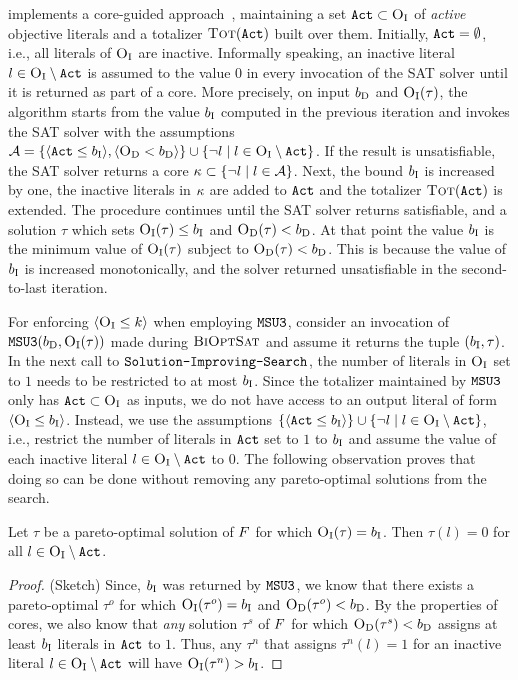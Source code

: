 \msu{} implements a core-guided approach~\autocite{DBLP:journals/corr/abs-0712-1097,DBLP:conf/sat/AnsoteguiBL09}, maintaining a set $\texttt{Act} \subset \textsc{O}_{\text{I}}$ of \emph{active} objective literals and a totalizer $\textsc{Tot}(\texttt{Act})$ built over them. 
Initially, $\texttt{Act} = \emptyset$, i.e., all literals of $\textsc{O}_{\text{I}}$ are inactive.
Informally speaking, an inactive literal $l \in \textsc{O}_{\text{I}} \setminus \texttt{Act}$ is assumed to the value $0$ in every invocation of the SAT solver until it is returned as part of a core.
More precisely, on input $b_{\text{D}}$ and $\textsc{O}_{\text{I}}(\tau)$, the algorithm starts from the value $b_{\text{I}}$ computed in the previous iteration and invokes the SAT solver with the assumptions $\mathcal{A} = \{\langle \texttt{Act} \leq b_{\text{I}} \rangle, \langle \textsc{O}_{\text{D}} < b_{\text{D}} \rangle  \} \cup \{ \lnot l \mid l \in \textsc{O}_{\text{I}} \setminus \texttt{Act}\}$.
If the result is unsatisfiable, the SAT solver returns a core $\kappa \subset \{\lnot l \mid l \in \mathcal{A}\}$.
Next, the bound $b_{\text{I}}$ is increased by one, the inactive literals in $\kappa$ are added to $\texttt{Act}$ and the totalizer $\textsc{Tot}(\texttt{Act})$ is extended.
The procedure continues until the SAT solver returns satisfiable, and a solution $\tau$ which sets $\textsc{O}_{\text{I}}(\tau) \leq b_{\text{I}}$ and $\textsc{O}_{\text{D}}(\tau) < b_{\text{D}}$.
At that point the value $b_{\text{I}}$ is the minimum value of $\textsc{O}_{\text{I}}(\tau)$ subject to $\textsc{O}_{\text{D}}(\tau) < b_{\text{D}}$.
This is because the value of $b_{\text{I}}$ is increased monotonically, and the solver returned unsatisfiable in the second-to-last iteration. 

For enforcing $\langle \textsc{O}_{\text{I}} \leq k \rangle$ when employing $\texttt{MSU3}$, consider an invocation of $\texttt{MSU3}(b_{\text{D}} , \textsc{O}_{\text{I}}(\tau))$ made during $\textsc{BiOptSat}$ and assume it returns the tuple $(b_{\text{I}}, \tau)$. 
In the next call to $\texttt{Solution-\allowbreak{}Improving-\allowbreak{}Search}$, the number of literals in $\textsc{O}_{\text{I}}$ set to $1$ needs to be restricted to at most $b_{\text{I}}$. 
Since the totalizer maintained by $\texttt{MSU3}$ only has $\texttt{Act} \subset \textsc{O}_{\text{I}}$ as inputs, we do not have access to an output literal of form  $\langle \textsc{O}_{\text{I}} \leq b_{\text{I}} \rangle$.
Instead, we use  the assumptions $\{\langle \texttt{Act} \leq b_{\text{I}} \rangle\} \cup \{ \lnot l \mid l \in \textsc{O}_{\text{I}} \setminus \texttt{Act} \}$, i.e., restrict the number of literals in $\texttt{Act}$ set to $1$ to $b_{\text{I}}$ and assume the value of each inactive literal $l \in \textsc{O}_{\text{I}} \setminus \texttt{Act}$ to $0$. 
The following observation proves that doing so can be done without removing any pareto-optimal solutions from the search. 
\begin{observation}\label{obs:sound}
  Let $\tau$ be a pareto-optimal solution of $F$ for which $\textsc{O}_{\text{I}}(\tau) = b_{\text{I}}$.
  Then $\tau(l) = 0$ for all $l \in \textsc{O}_{\text{I}} \setminus \texttt{Act}$. 
\end{observation}
\begin{proof}(Sketch)
  Since, $b_{\text{I}}$ was returned by $\texttt{MSU3}$, we know that there exists a pareto-optimal $\tau^o$ for which $\textsc{O}_{\text{I}}(\tau^o) = b_{\text{I}}$ and $\textsc{O}_{\text{D}}(\tau^o) < b_{\text{D}}$.
  By the properties of cores, we also know that \emph{any} solution $\tau^s$ of $F$ for which $\textsc{O}_{\text{D}}(\tau^s) < b_{\text{D}}$ assigns at least $b_{\text{I}}$ literals in $\texttt{Act}$ to $1$.
  Thus, any $\tau^n$ that assigns $\tau^n(l) = 1$ for an inactive literal $l \in  \textsc{O}_{\text{I}} \setminus \texttt{Act}$ will have $\textsc{O}_{\text{I}}(\tau^n) > b_{\text{I}}$.
\end{proof}

